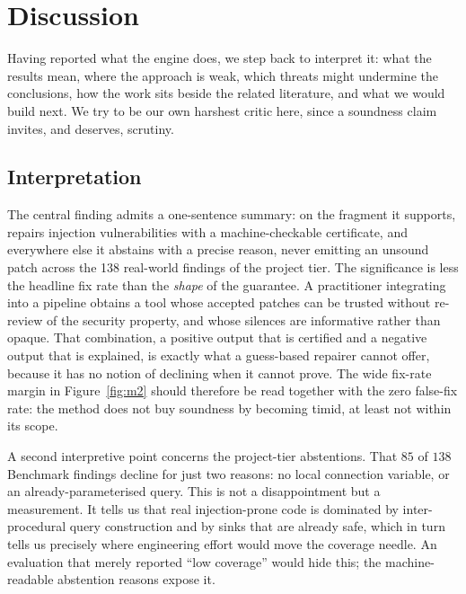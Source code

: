 \section{Discussion}
\label{rem:discussion}

Having reported what the engine does, we step back to interpret it: what the
results mean, where the approach is weak, which threats might undermine the
conclusions, how the work sits beside the related literature, and what we
would build next. We try to be our own harshest critic here, since a
soundness claim invites, and deserves, scrutiny.

\subsection{Interpretation}
\label{sec:disc-interpret}

The central finding admits a one-sentence summary: on the fragment it
supports, \irsam{} repairs injection vulnerabilities with a machine-checkable
certificate, and everywhere else it abstains with a precise reason, never
emitting an unsound patch across the 138 real-world findings of the project
tier. The significance is less the headline fix rate than the \emph{shape} of
the guarantee. A practitioner integrating \irsam{} into a pipeline obtains a
tool whose accepted patches can be trusted without re-review of the security
property, and whose silences are informative rather than opaque. That
combination, a positive output that is certified and a negative output that is
explained, is exactly what a guess-based repairer cannot offer, because it
has no notion of declining when it cannot prove. The wide fix-rate margin in
Figure~\ref{fig:m2} should therefore be read together with the zero
false-fix rate: the method does not buy soundness by becoming timid, at least
not within its scope.

A second interpretive point concerns the project-tier abstentions. That
$85$ of $138$ Benchmark findings decline for just two reasons: no
local connection variable, or an already-parameterised query. This is not a
disappointment but a measurement. It tells us that real injection-prone code
is dominated by inter-procedural query construction and by sinks that are
already safe, which in turn tells us precisely where engineering effort would
move the coverage needle. An evaluation that merely reported ``low coverage''
would hide this; the machine-readable abstention reasons expose it.

